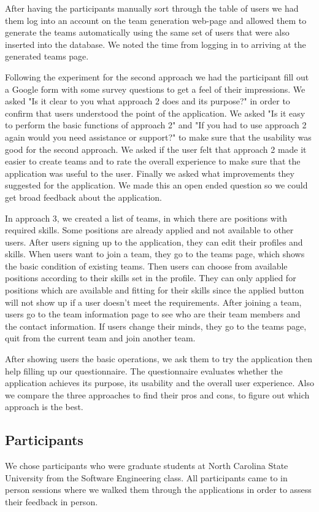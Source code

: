 \documentclass[conference]{IEEEtran}
\begin{document}
After having the participants manually sort through the table of users we had them log into an account on the team generation web-page and allowed them to generate the teams automatically using the same set of users that were also inserted into the database. We noted the time from logging in to arriving at the generated teams page.

Following the experiment for the second approach we had the participant fill out a Google form with some survey questions to get a feel of their impressions. We asked "Is it clear to you what approach 2 does and its purpose?" in order to confirm that users understood the point of the application. We asked "Is it easy to perform the basic functions of approach 2" and "If you had to use approach 2 again would you need assistance or support?" to make sure that the usability was good for the second approach. We asked if the user felt that approach 2 made it easier to create teams and to rate the overall experience to make sure that the application was useful to the user. Finally we asked what improvements they suggested for the application. We made this an open ended question so we could get broad feedback about the application. 

In approach 3, we created a list of teams, in which there are positions with required skills. Some positions are already applied and not available to other users. After users signing up to the application, they can edit their profiles and skills. When users want to join a team, they go to the teams page, which shows the basic condition of existing teams. Then users can choose from available positions according to their skills set in the profile. They can only applied for positions which are available and fitting for their skills since the applied button will not show up if a user doesn't meet the requirements. After joining a team, users go to the team information page to see who are their team members and the contact information. If users change their minds, they go to the teams page, quit from the current team and join another team. 

After showing users the basic operations, we ask them to try the application then help filling up our questionnaire. The questionnaire evaluates whether the application achieves its purpose, its usability and the overall user experience. Also we compare the three approaches to find their pros and cons, to figure out which approach is the best.

\subsection{Participants}
We chose participants who were graduate students at North Carolina State University from the Software Engineering class. All participants came to in person sessions where we walked them through the applications in order to assess their feedback in person. 
\end{document}
